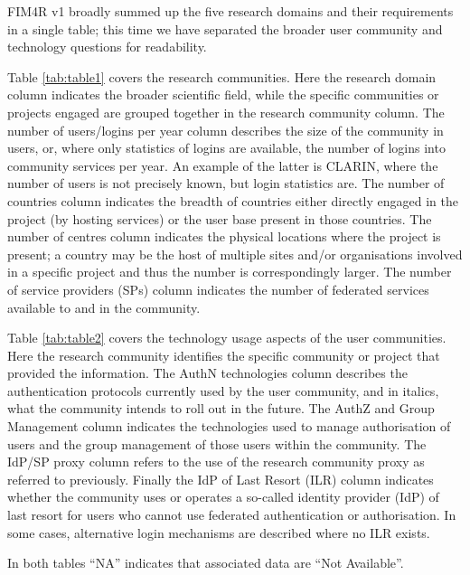 \documentclass[fleqn,11pt]{wlscirep}
\begin{document}
{FIM4R v1 broadly summed up the five research domains and their requirements in a single table; this time we have separated the broader user community and technology questions for readability.

Table \ref{tab:table1} covers the research communities. Here the research domain column indicates the broader scientific field, while the specific communities or projects engaged are grouped together in the research community column. The number of users/logins per year column describes the size of the community in users, or, where only statistics of logins are available, the number of logins into community services per year. An example of the latter is CLARIN, where the number of users is not precisely known, but login statistics are. The number of countries column indicates the breadth of countries either directly engaged in the project (by hosting services) or the user base present in those countries. The number of centres column indicates the physical locations where the project is present; a country may be the host of multiple sites and/or organisations involved in a specific project and thus the number is correspondingly larger. The number of service providers (SPs) column indicates the number of federated services available to and in the community.

Table \ref{tab:table2} covers the technology usage aspects of the user communities. Here the research community identifies the specific community or project that provided the information. The AuthN technologies column describes the authentication protocols currently used by the user community, and in italics, what the community intends to roll out in the future. The AuthZ and Group Management column indicates the technologies used to manage authorisation of users and the group management of those users within the community. The IdP/SP proxy column refers to the use of the research community proxy as referred to previously. Finally the IdP of Last Resort (ILR) column indicates whether the community uses or operates a so-called identity provider (IdP) of last resort for users who cannot use federated authentication or authorisation. In some cases, alternative login mechanisms are described where no ILR exists.

In both tables “NA” indicates that associated data are “Not Available”.

}
\end{document}
